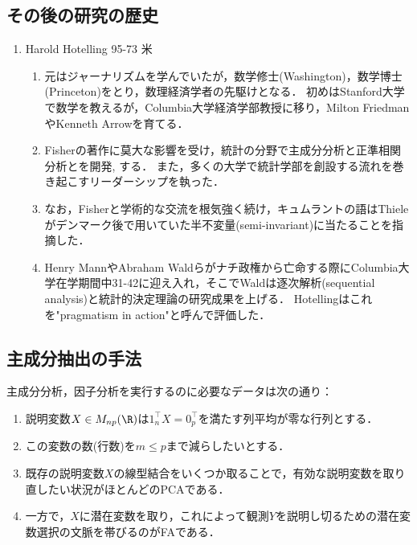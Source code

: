 \documentclass[uplatex,dvipdfmx]{jsreport}
\begin{document}
\subsection{その後の研究の歴史}

\begin{history}[経済学]\mbox{}
    \begin{enumerate}
        \item Harold Hotelling 95-73 米
        \begin{enumerate}
            \item 元はジャーナリズムを学んでいたが，数学修士(Washington)，数学博士(Princeton)をとり，数理経済学者の先駆けとなる．
            初めはStanford大学で数学を教えるが，Columbia大学経済学部教授に移り，Milton FriedmanやKenneth Arrowを育てる．
            \item Fisherの著作\cite{Fisher25-ForResearchWorkers}に莫大な影響を受け，統計の分野で主成分分析と正準相関分析とを開発\cite{Hotelling35}, \cite{Hotelling36}する．
            また，多くの大学で統計学部を創設する流れを巻き起こすリーダーシップを執った．
            \item なお，Fisherと学術的な交流を根気強く続け，キュムラントの語はThieleがデンマーク後で用いていた半不変量(semi-invariant)に当たることを指摘した．
            \item Henry MannやAbraham Waldらがナチ政権から亡命する際にColumbia大学在学期間中31-42に迎え入れ，そこでWaldは逐次解析(sequential analysis)と統計的決定理論の研究成果を上げる．
            Hotellingはこれを"pragmatism in action"と呼んで評価した．
        \end{enumerate}
    \end{enumerate}
\end{history}

\subsection{主成分抽出の手法}

\begin{problem}[低階数近似の問題]\mbox{}
    主成分分析，因子分析を実行するのに必要なデータは次の通り：
    \begin{enumerate}
        \item 説明変数$X\in M_{np}(\R)$は$1_n^\top X=0_p^\top$を満たす列平均が零な行列とする．
        \item この変数の数(行数)を$m\le p$まで減らしたいとする．
        \item 既存の説明変数$X$の線型結合をいくつか取ることで，有効な説明変数を取り直したい状況がほとんどのPCAである．
        \item 一方で，$X$に潜在変数を取り，これによって観測$Y$を説明し切るための潜在変数選択の文脈を帯びるのがFAである．
    \end{enumerate}
\end{problem}
\end{document}
